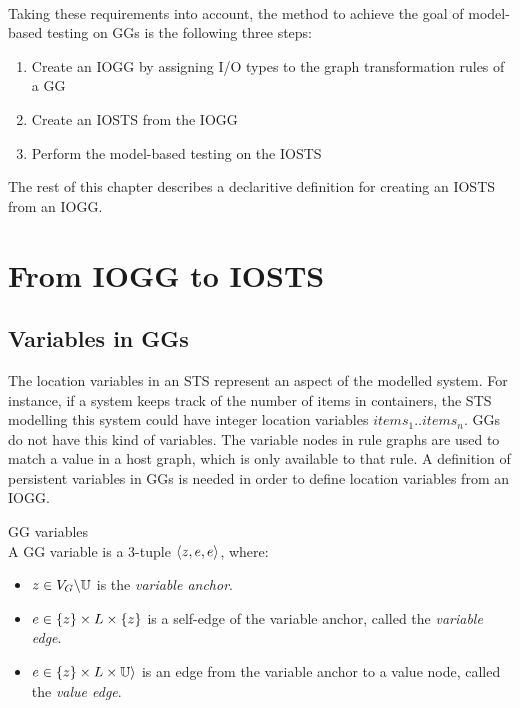 \paragraph*{} Taking these requirements into account, the method to achieve the goal of model-based testing on GGs is the following three steps:
\begin{enumerate}
\item Create an IOGG by assigning I/O types to the graph transformation rules of a GG
\item Create an IOSTS from the IOGG
\item Perform the model-based testing on the IOSTS
\end{enumerate}
The rest of this chapter describes a declaritive definition for creating an IOSTS from an IOGG.

\section{From IOGG to IOSTS}\label{sec:algorithm}
\subsection{Variables in GGs} 
The location variables in an STS represent an aspect of the modelled system. For instance, if a system keeps track of the number of items in containers, the STS modelling this system could have integer location variables $\mathit{items}_1..\mathit{items}_n$. GGs do not have this kind of variables. The variable nodes in rule graphs are used to match a value in a host graph, which is only available to that rule. A definition of persistent variables in GGs is needed in order to define location variables from an IOGG.

\vspace{10px}
\begin{definition} GG variables \\
A GG variable is a 3-tuple $\langle z, e, e\rangle$, where:
\begin{itemize}
\item {}$z \in V_{G}\backslash\mathbb{U}$ is the \textit{variable anchor}.
\item {}$e \in \{z\} \times L \times \{z\}$ is a self-edge of the variable anchor, called the \textit{variable edge}.
\item {}$e \in \{z\} \times L \times \mathbb{U}\rangle$ is an edge from the variable anchor to a value node, called the \textit{value edge}.
\end{itemize}
\end{definition}
\vspace{10px}

